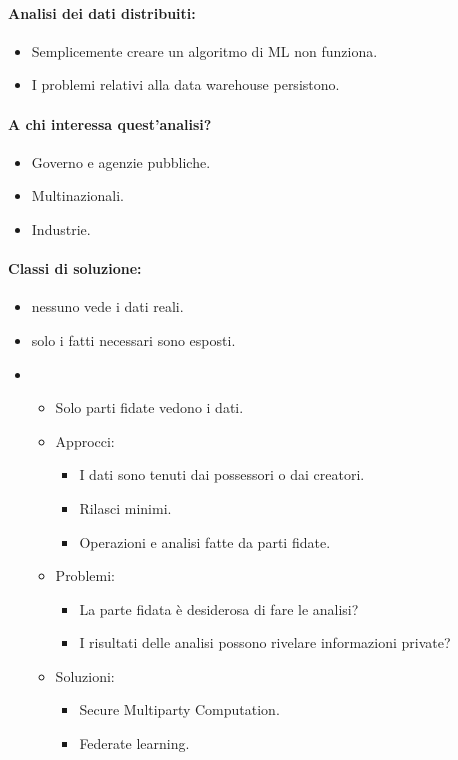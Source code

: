 \paragraph{Analisi dei dati distribuiti:}

\begin{itemize}
  \item Semplicemente creare un algoritmo di ML non funziona. 
  \item I problemi relativi alla data warehouse persistono. 
\end{itemize}

\paragraph{A chi interessa quest'analisi?}

\begin{itemize}
  \item Governo e agenzie pubbliche. 
  \item Multinazionali. 
  \item Industrie. 
\end{itemize}

\paragraph{Classi di soluzione:}

\begin{itemize}
  \item {} nessuno vede i dati reali. 
  \item {} solo i fatti necessari sono esposti. 
  \item {} 
    \begin{itemize}
      \item Solo parti fidate vedono i dati. 
      \item Approcci:
        \begin{itemize}
          \item I dati sono tenuti dai possessori o dai creatori. 
          \item Rilasci minimi. 
          \item Operazioni e analisi fatte da parti fidate. 
        \end{itemize}
      \item Problemi: 
        \begin{itemize}
          \item La parte fidata è desiderosa di fare le analisi? 
          \item I risultati delle analisi possono rivelare informazioni private?
        \end{itemize}
      \item Soluzioni:
        \begin{itemize}
          \item Secure Multiparty Computation. 
          \item Federate learning.
        \end{itemize}
    \end{itemize}
\end{itemize}

